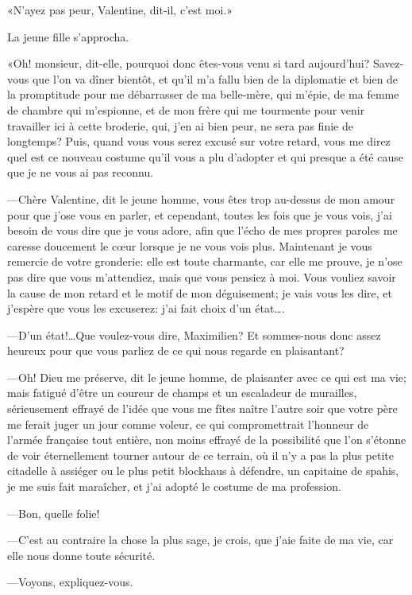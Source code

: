 «N'ayez pas peur, Valentine, dit-il, c'est moi.» 

La jeune fille s'approcha.  

«Oh! monsieur, dit-elle, pourquoi donc êtes-vous venu si tard aujourd'hui? Savez-vous que l'on va dîner bientôt, et qu'il m'a fallu bien de la diplomatie et bien de la promptitude pour me débarrasser de ma belle-mère, qui m'épie, de ma femme de chambre qui m'espionne, et de mon frère qui me tourmente pour venir travailler ici à cette broderie, qui, j'en ai bien peur, ne sera pas finie de longtemps? Puis, quand vous vous serez excusé sur votre retard, vous me direz quel est ce nouveau costume qu'il vous a plu d'adopter et qui presque a été cause que je ne vous ai pas reconnu. 

—Chère Valentine, dit le jeune homme, vous êtes trop au-dessus de mon amour pour que j'ose vous en parler, et cependant, toutes les fois que je vous vois, j'ai besoin de vous dire que je vous adore, afin que l'écho de mes propres paroles me caresse doucement le cœur lorsque je ne vous vois plus. Maintenant je vous remercie de votre gronderie: elle est toute charmante, car elle me prouve, je n'ose pas dire que vous m'attendiez, mais que vous pensiez à moi. Vous vouliez savoir la cause de mon retard et le motif de mon déguisement; je vais vous les dire, et j'espère que vous les excuserez: j'ai fait choix d'un état\dots. 

—D'un état!\dots Que voulez-vous dire, Maximilien? Et sommes-nous donc assez heureux pour que vous parliez de ce qui nous regarde en plaisantant? 

—Oh! Dieu me préserve, dit le jeune homme, de plaisanter avec ce qui est ma vie; mais fatigué d'être un coureur de champs et un escaladeur de murailles, sérieusement effrayé de l'idée que vous me fîtes naître l'autre soir que votre père me ferait juger un jour comme voleur, ce qui compromettrait l'honneur de l'armée française tout entière, non moins effrayé de la possibilité que l'on s'étonne de voir éternellement tourner autour de ce terrain, où il n'y a pas la plus petite citadelle à assiéger ou le plus petit blockhaus à défendre, un capitaine de spahis, je me suis fait maraîcher, et j'ai adopté le costume de ma profession. 

—Bon, quelle folie! 

—C'est au contraire la chose la plus sage, je crois, que j'aie faite de ma vie, car elle nous donne toute sécurité. 

—Voyons, expliquez-vous. 


